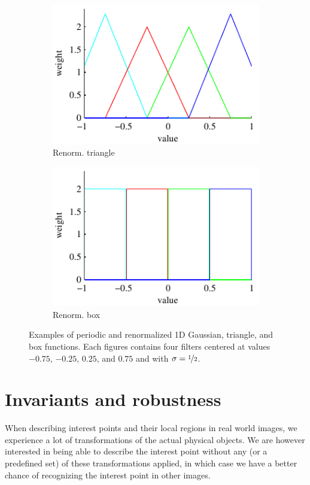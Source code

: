 \documentclass[thesis.tex]{subfiles}
\begin{document}
\begin{figure}
\begin{subfigure}[t]{0.32\textwidth}
		\includegraphics[width=\textwidth]{img/binFilterTriangleRenorm.pdf}
		\caption{Renorm. triangle}
		\label{fig:1dFilterTriangleRenorm}
	\end{subfigure}
	\begin{subfigure}[t]{0.32\textwidth}
		\includegraphics[width=\textwidth]{img/binFilterBoxRenorm.pdf}
		\caption{Renorm. box}
		\label{fig:1dFilterBoxRenorm}
	\end{subfigure}
	\caption{Examples of periodic and renormalized 1D Gaussian, triangle, and box functions. Each figures contains four filters centered at values $-0.75$, $-0.25$, $0.25$, and $0.75$ and with $\sigma = \nicefrac{1}{2}$.}
	\label{fig:1dFilters}
\end{figure}
%
\section{Invariants and robustness}
When describing interest points and their local regions in real world images, we experience a lot of transformations of the actual physical objects. We are however interested in being able to describe the interest point without any (or a predefined set) of these transformations applied, in which case we have a better chance of recognizing the interest point in other images.
\end{document}
